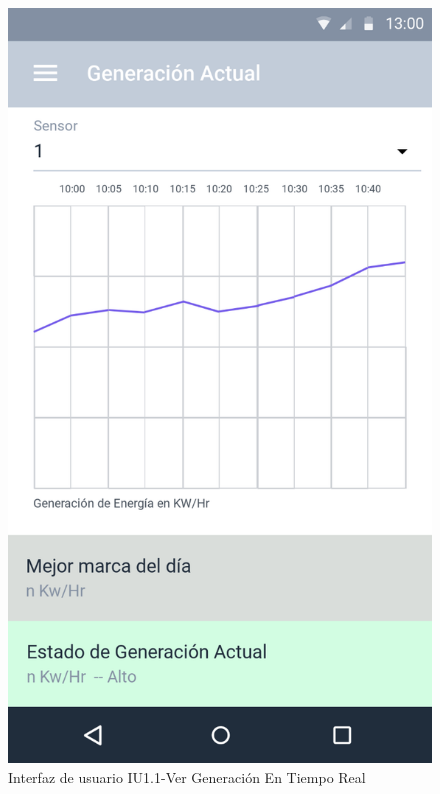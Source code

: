 \begin{figure}[H]
	\centering
	\includegraphics[scale=0.70]{Capitulo4/software/submodulos/images/monitoreo.png}
	\caption{Interfaz de usuario IU1.1-Ver Generación En Tiempo Real}
	\label{fig:monitoreo}
\end{figure}

